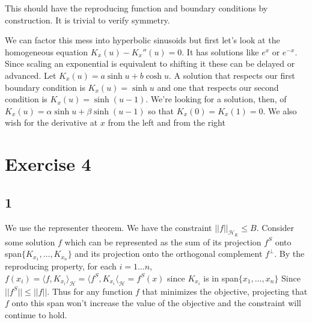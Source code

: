 \documentclass[12pt]{article}
\begin{document}
This should have the reproducing function and boundary conditions by construction. It is trivial to verify symmetry.

We can factor this mess into hyperbolic sinusoids but first let's look at the homogeneous equation $K_x(u) - K_x''(u) = 0$. It has solutions like $e^x$ or $e^{-x}$. Since scaling an exponential is equivalent to shifting it these can be delayed or advanced. Let $K_x(u) = a \sinh u + b \cosh u$. A solution that respects our first boundary condition is $K_x(u) = \sinh u$ and one that respects our second condition is $K_x(u) = \sinh (u-1)$. We're looking for a solution, then, of $K_x(u) = \alpha \sinh u + \beta \sinh (u-1)$ so that $K_x(0) = K_x(1) = 0$. We also wish for the derivative at $x$ from the left and from the right




\section{Exercise 4}
\subsection{1}
We use the representer theorem. We have the constraint $||f||_{\mathcal{H}_K} \leq B$. Consider some solution $f$ which can be represented as the sum of its projection $f^S$ onto span$\{K_{x_1},\ldots, K_{x_n}\}$ and its projection onto the orthogonal complement $f^\bot$. By the reproducing property, for each $i=1\ldots n$, $f(x_i) = \langle f, K_{x_i} \rangle_\mathcal{H} = \langle f^S, K_{x_i} \langle_\mathcal{H} = f^S(x)$ since $K_{x_i}$ is in span$\{x_1, \ldots, x_n\}$ Since $||f^S|| \leq ||f||$. Thus for any function $f$ that minimizes the objective, projecting that $f$ onto this span won't increase the value of the objective and the constraint will continue to hold.
\end{document}
